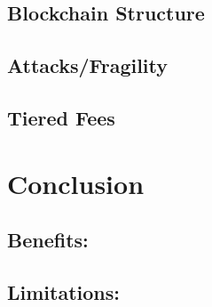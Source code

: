 \documentclass[11pt,a4paper]{article}
\begin{document}
\subsection{Blockchain Structure}

\subsection{Attacks/Fragility}

\subsection{Tiered Fees}



\pagebreak


\section{Conclusion}

\subsection{Benefits:}
\subsection{Limitations:}


\pagebreak
\printglossaries
\end{document}
